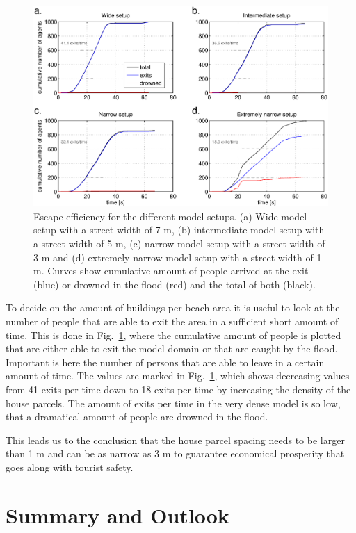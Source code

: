 \documentclass[11pt]{article}
\begin{document}
\begin{figure}
	\centering
	\includegraphics[width=1.1\textwidth]{figures/AnalysisMULTI_BeachEvacuationOneExitStreetWidth1_Flood0_1.eps}
	\caption{Escape efficiency for the different model setups. (a) Wide model setup with a street width of 7 m, (b) intermediate model setup with a street width of 5 m, (c) narrow model setup with a street width of 3 m and (d) extremely narrow model setup with a street width of 1 m. Curves show cumulative amount of people arrived at the exit (blue) or drowned in the flood (red) and the total of both (black).}
	\label{fig:analysis_1}
\end{figure}

To decide on the amount of buildings per beach area it is useful to look at the number of people that are able to exit the area in a sufficient short amount of time. This is done in Fig.~\ref{fig:analysis_1}, where the cumulative amount of people is plotted that are either able to exit the model domain or that are caught by the flood. Important is here the number of persons that are able to leave in a certain amount of time. The values are marked in Fig.~\ref{fig:analysis_1}, which shows decreasing values from 41 exits per time down to 18 exits per time by increasing the density of the house parcels. The amount of exits per time in the very dense model is so low, that a dramatical amount of people are drowned in the flood.

This leads us to the conclusion that the house parcel spacing needs to be larger than 1 m and can be as narrow as 3 m to guarantee economical prosperity that goes along with tourist safety.


\section{Summary and Outlook}
\end{document}
